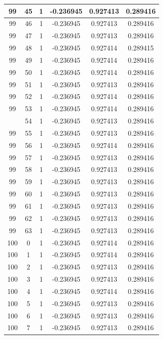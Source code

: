 \documentclass[12pt,a4paper]{article}
\numberwithin{equation}{section}
\numberwithin{figure}{section}
\numberwithin{table}{section}
\begin{document}
\begin{longtable}{|c|c|c|c|c|c|}
99 & 45 & 1 & -0.236945 & 0.927413 & 0.289416 \\ \hline
99 & 46 & 1 & -0.236945 & 0.927413 & 0.289416 \\ \hline
99 & 47 & 1 & -0.236945 & 0.927413 & 0.289416 \\ \hline
99 & 48 & 1 & -0.236945 & 0.927414 & 0.289415 \\ \hline
99 & 49 & 1 & -0.236945 & 0.927414 & 0.289416 \\ \hline
99 & 50 & 1 & -0.236945 & 0.927414 & 0.289416 \\ \hline
99 & 51 & 1 & -0.236945 & 0.927413 & 0.289416 \\ \hline
99 & 52 & 1 & -0.236945 & 0.927414 & 0.289416 \\ \hline
99 & 53 & 1 & -0.236945 & 0.927414 & 0.289416 \\ \hline
\pagebreak
99 & 54 & 1 & -0.236945 & 0.927413 & 0.289416 \\ \hline
99 & 55 & 1 & -0.236945 & 0.927413 & 0.289416 \\ \hline
99 & 56 & 1 & -0.236945 & 0.927414 & 0.289416 \\ \hline
99 & 57 & 1 & -0.236945 & 0.927413 & 0.289416 \\ \hline
99 & 58 & 1 & -0.236945 & 0.927413 & 0.289416 \\ \hline
99 & 59 & 1 & -0.236945 & 0.927413 & 0.289416 \\ \hline
99 & 60 & 1 & -0.236945 & 0.927413 & 0.289416 \\ \hline
99 & 61 & 1 & -0.236945 & 0.927413 & 0.289416 \\ \hline
99 & 62 & 1 & -0.236945 & 0.927413 & 0.289416 \\ \hline
99 & 63 & 1 & -0.236945 & 0.927413 & 0.289416 \\ \hline
100 & 0 & 1 & -0.236945 & 0.927414 & 0.289416 \\ \hline
100 & 1 & 1 & -0.236945 & 0.927414 & 0.289416 \\ \hline
100 & 2 & 1 & -0.236945 & 0.927413 & 0.289416 \\ \hline
100 & 3 & 1 & -0.236945 & 0.927413 & 0.289416 \\ \hline
100 & 4 & 1 & -0.236945 & 0.927414 & 0.289416 \\ \hline
100 & 5 & 1 & -0.236945 & 0.927413 & 0.289416 \\ \hline
100 & 6 & 1 & -0.236945 & 0.927413 & 0.289416 \\ \hline
100 & 7 & 1 & -0.236945 & 0.927413 & 0.289416 \\ \hline

\end{longtable}
\end{document}
